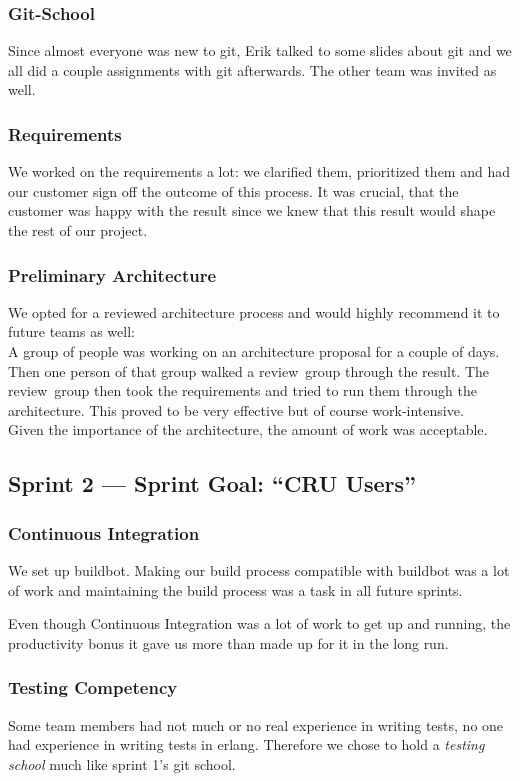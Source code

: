 \documentclass[11pt,a4paper]{report}
\begin{document}
\subsubsection{Git-School}
Since almost everyone was new to git, Erik talked to some slides about git and
we all did a couple assignments with git afterwards.
The other team was invited as well.
\subsubsection{Requirements}
We worked on the requirements a lot: we clarified them, prioritized them and had
our customer sign off the outcome of this process. It was crucial, that the
customer was happy with the result since we knew that this result would shape
the rest of our project.
\subsubsection{Preliminary Architecture}
We opted for a reviewed architecture process and would highly recommend it to
future teams as well: \\
A group of people was working on an architecture proposal for a couple of days.
Then one person of that group walked a review~group through the result. The
review~group then took the requirements and tried to run them through the
architecture. This proved to be very effective but of course work-intensive. \\
Given the importance of the architecture, the amount of work was acceptable.

\subsection*{Sprint 2 --- Sprint Goal: ``CRU Users''}
\subsubsection{Continuous Integration}
We set up buildbot. Making our build process compatible with buildbot was a lot
of work and maintaining the build process was a task in all future sprints.

Even though Continuous Integration was a lot of work to get up and running, the
productivity bonus it gave us more than made up for it in the long run.

\subsubsection{Testing Competency}
Some team members had not much or no real experience in writing tests, no one
had experience in writing tests in erlang. Therefore we chose to hold a
{\em testing school\/} much like sprint 1's git school.
\end{document}
